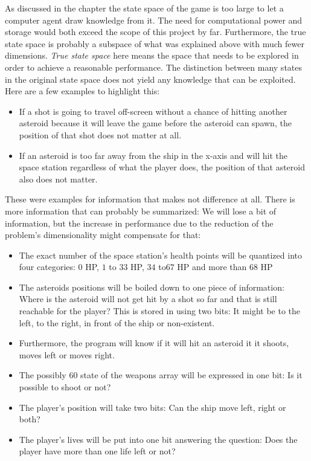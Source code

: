 \documentclass[a4paper,10pt]{article}
\begin{document}
As discussed in the chapter  the state space of the game is too large to let a computer agent draw knowledge from it.
The need for computational power and storage would both exceed the scope of this project by far.
Furthermore, the true state space is probably a subspace of what was explained above with much fewer dimensions.
\emph{True state space} here means the space that needs to be explored in order to achieve a reasonable performance. 
The distinction between many states in the original state space does not yield any knowledge that can be exploited.
Here are a few examples to highlight this:
\begin{itemize}
 \item If a shot is going to travel off-screen without a chance of hitting another asteroid because it will leave the game before the asteroid can spawn, the position of that shot does not matter at all.
 \item If an asteroid is too far away from the ship in the x-axis and will hit the space station regardless of what the player does, the position of that asteroid also does not matter.
\end{itemize}
These were examples for information that makes not difference at all.
There is more information that can probably be summarized: We will lose a bit of information, but the increase in performance due to the reduction of the problem's dimensionality might compensate for that:
\begin{itemize}
 \item The exact number of the space station's health points will be quantized into four categories: $0$ HP, $1$ to $33$ HP, $34$ to$ 67$ HP and more than $68$ HP %
 \item The asteroids positions will be boiled down to one piece of information: Where is the asteroid will not get hit by a shot so far and that is still reachable for the player? 
 This is stored in using two bits: It might be to the left, to the right, in front of the ship or non-existent. %
 \item Furthermore, the program will know if it will hit an asteroid it it shoots, moves left or moves right. %
 \item The possibly $60$ state of the weapons array will be expressed in one bit: Is it possible to shoot or not? %
 \item The player's position will take two bits: Can the ship move left, right or both? %
 \item The player's lives will be put into one bit answering the question: Does the player have more than one life left or not? %
\end{itemize}
\end{document}
